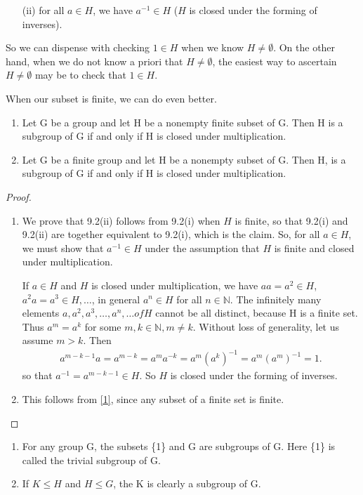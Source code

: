 \documentclass[11pt]{amsbook}
\begin{document}

\begin{enumerate}
	\item[(ii)]
		for all $a \in H$, we have $a^{-1} \in H$ ($H$ is closed under the forming of inverses).
\end{enumerate}\par

So we can dispense with checking $1 \in H$ when we know $H \neq \emptyset$. On the other hand, when we do not know a priori that $H \neq \emptyset$, the easiest way to ascertain $H \neq \emptyset$ may be to check that $1 \in H$.\par
When our subset is finite, we can do even better.\par

\begin{lem}
\begin{enumerate}
	\item
		Let G be a group and let H be a nonempty finite subset of G. Then H is a subgroup of G if and only if H is closed under multiplication.
	\item
		Let G be a finite group and let H be a nonempty subset of G. Then H, is a subgroup of G if and only if H is closed under multiplication.
\end{enumerate}
\end{lem}

\begin{proof}
\begin{enumerate}
	\item \label{1}
		We prove that 9.2(ii) follows from 9.2(i)  when $H$ is finite, so that 9.2(i) and 9.2(ii) are together equivalent to 9.2(i), which is the claim. So, for all $a \in H$, we must show that $a^{-1} \in H$ under the assumption that $H$ is finite and closed under multiplication.\par
If $a \in H$ and $H$ is closed under multiplication, we have $aa = a^{2} \in H$, $a^{2} a = a^{3} \in H, \ldots$, in general $a^{n} \in H$ for all $n \in \mathbb{N}$. The infinitely many elements $a,a^{2},a^{3},\ldots ,a^{n} , \ldots of H$ cannot be all distinct, because H is a finite set. Thus $a^{m}= a^{k}$ for some $m,k \in \mathbb{N}, m \neq k$. Without loss of generality, let us assume
$m > k$. Then
\begin{align*}
	a^{m-k-1} a = a^{m-k} = a^{m}a^{-k} = a^{m}(a^{k})^{-1} = a^{m}(a^{m})^{-1} = 1.
\end{align*}
so that $a^{-1} = a^{m-k-1} \in H$. So $H$ is closed under the forming of inverses.

	\item
		This follows from \ref{1}, since any subset of a finite set is finite.
\end{enumerate}
\end{proof}

\begin{exmp}
\begin{enumerate}[label=(a)]
	\item
		For any group G, the subsets \{1\} and G are subgroups of G. Here \{1\} is called the trivial subgroup of G.
	\item
		If $K \leq H$ and $H \leq G$, the K is clearly a subgroup of G.
\end{enumerate}
\end{exmp}
\end{document}
